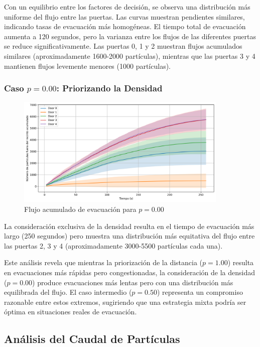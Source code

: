 \documentclass[12pt]{article}
\begin{document}
Con un equilibrio entre los factores de decisión, se observa una distribución más uniforme del flujo entre las puertas. Las curvas muestran pendientes similares, indicando tasas de evacuación más homogéneas. El tiempo total de evacuación aumenta a 120 segundos, pero la varianza entre los flujos de las diferentes puertas se reduce significativamente. Las puertas 0, 1 y 2 muestran flujos acumulados similares (aproximadamente 1600-2000 partículas), mientras que las puertas 3 y 4 mantienen flujos levemente menores (1000 partículas).

\subsubsection{Caso $p=0.00$: Priorizando la Densidad}

\begin{figure}[H]
    \centering
    \includegraphics[width=0.9\textwidth]{img/cumulative_door_flows_t_20_&_p_0.00.png}
    \caption{Flujo acumulado de evacuación para $p=0.00$}
    \label{fig:flow_p000}
\end{figure}

La consideración exclusiva de la densidad resulta en el tiempo de evacuación más largo (250 segundos) pero muestra una distribución más equitativa del flujo entre las puertas 2, 3 y 4 (aproximadamente 3000-5500 partículas cada una). 

Este análisis revela que mientras la priorización de la distancia ($p=1.00$) resulta en evacuaciones más rápidas pero congestionadas, la consideración de la densidad ($p=0.00$) produce evacuaciones más lentas pero con una distribución más equilibrada del flujo. El caso intermedio ($p=0.50$) representa un compromiso razonable entre estos extremos, sugiriendo que una estrategia mixta podría ser óptima en situaciones reales de evacuación.

\subsection{Análisis del Caudal de Partículas}
\end{document}
